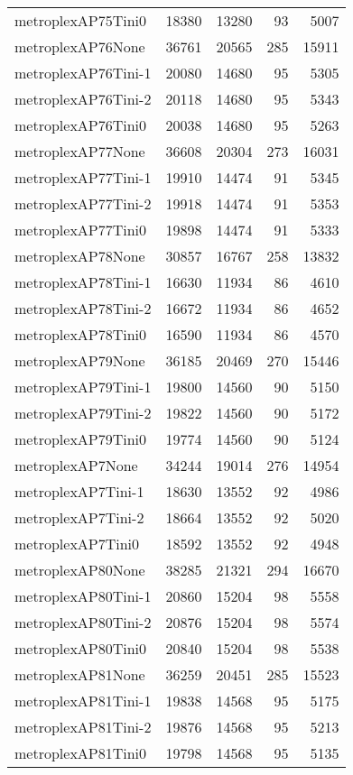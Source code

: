 \begin{longtable}{lrrrr}
metroplexAP75Tini0 & 18380 & 13280 & 93 & 5007 \\
metroplexAP76None & 36761 & 20565 & 285 & 15911 \\
metroplexAP76Tini-1 & 20080 & 14680 & 95 & 5305 \\
metroplexAP76Tini-2 & 20118 & 14680 & 95 & 5343 \\
metroplexAP76Tini0 & 20038 & 14680 & 95 & 5263 \\
metroplexAP77None & 36608 & 20304 & 273 & 16031 \\
metroplexAP77Tini-1 & 19910 & 14474 & 91 & 5345 \\
metroplexAP77Tini-2 & 19918 & 14474 & 91 & 5353 \\
metroplexAP77Tini0 & 19898 & 14474 & 91 & 5333 \\
metroplexAP78None & 30857 & 16767 & 258 & 13832 \\
metroplexAP78Tini-1 & 16630 & 11934 & 86 & 4610 \\
metroplexAP78Tini-2 & 16672 & 11934 & 86 & 4652 \\
metroplexAP78Tini0 & 16590 & 11934 & 86 & 4570 \\
metroplexAP79None & 36185 & 20469 & 270 & 15446 \\
metroplexAP79Tini-1 & 19800 & 14560 & 90 & 5150 \\
metroplexAP79Tini-2 & 19822 & 14560 & 90 & 5172 \\
metroplexAP79Tini0 & 19774 & 14560 & 90 & 5124 \\
metroplexAP7None & 34244 & 19014 & 276 & 14954 \\
metroplexAP7Tini-1 & 18630 & 13552 & 92 & 4986 \\
metroplexAP7Tini-2 & 18664 & 13552 & 92 & 5020 \\
metroplexAP7Tini0 & 18592 & 13552 & 92 & 4948 \\
metroplexAP80None & 38285 & 21321 & 294 & 16670 \\
metroplexAP80Tini-1 & 20860 & 15204 & 98 & 5558 \\
metroplexAP80Tini-2 & 20876 & 15204 & 98 & 5574 \\
metroplexAP80Tini0 & 20840 & 15204 & 98 & 5538 \\
metroplexAP81None & 36259 & 20451 & 285 & 15523 \\
metroplexAP81Tini-1 & 19838 & 14568 & 95 & 5175 \\
metroplexAP81Tini-2 & 19876 & 14568 & 95 & 5213 \\
metroplexAP81Tini0 & 19798 & 14568 & 95 & 5135 \\

\end{longtable}
